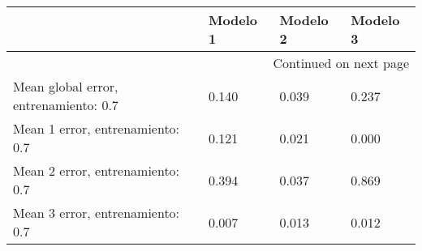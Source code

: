 \begin{longtable}{p{4cm}|p{2cm}|p{2cm}|p{2cm}}
\toprule
{} &  Modelo 1 &  Modelo 2 &  Modelo 3 \\
\midrule
\endhead
\midrule
\multicolumn{4}{r}{{Continued on next page}} \\
\midrule
\endfoot

\bottomrule
\endlastfoot
Mean global error, entrenamiento: 0.7 &     0.140 &     0.039 &     0.237 \\
Mean 1 error, entrenamiento: 0.7      &     0.121 &     0.021 &     0.000 \\
Mean 2 error, entrenamiento: 0.7      &     0.394 &     0.037 &     0.869 \\
Mean 3 error, entrenamiento: 0.7      &     0.007 &     0.013 &     0.012 \\
\end{longtable}
